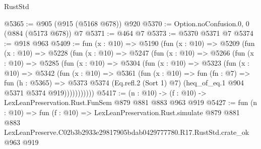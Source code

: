 \begin{lexlean}{RustStd}
\begin{coremodule}
@5365 := @905 (@915 (@5168 @678)) @920
@5370 := Option.noConfusion.{0, 0} (@884 (@5173 @678)) @7
@5371 := @464 @7
@5373 := @5370 @5371 @7
@5374 := @918 @963
@5409 := fun (x : @10) =>
  @5190
    (fun (x : @10) =>
    @5209
      (fun (x : @10) =>
      @5228
        (fun (x : @10) =>
        @5247
          (fun (x : @10) =>
          @5266
            (fun (x : @10) =>
            @5285
              (fun (x : @10) =>
              @5304
                (fun (x : @10) =>
                @5323
                  (fun (x : @10) =>
                  @5342
                    (fun (x : @10) =>
                    @5361
                      (fun (x : @10) =>
                      fun (fn : @7) =>
                      fun (h : @5365) =>
                      @5373
                        @5374
                        (Eq.refl.{2} (Sort 1) @7)
                        (heq_of_eq.{1} @904 @5371 @5374 @919)))))))))))
@5417 := (n : @10) -> (f : @10) -> LexLeanPreservation.Rust.FunSem @879 @881 @883 @963 @919
@5427 := fun (n : @10) =>
  fun (f : @10) =>
  LexLeanPreservation.Rust.simulate
    @879
    @881
    @883
    LexLeanPreserve.C02b3b2933e29817905bdab0429777780.R17.RustStd.crate_ok
    @963
    @919
\end{coremodule}
\end{lexlean}
